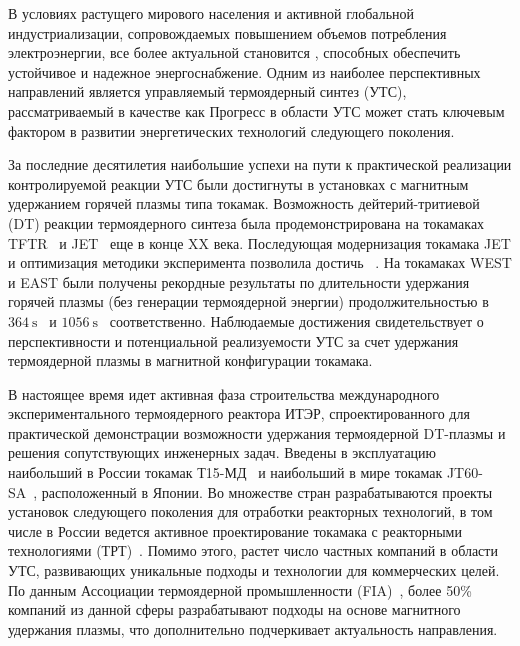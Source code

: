 
{\actuality} В условиях растущего мирового населения и активной глобальной индустриализации, сопровождаемых повышением объемов потребления электроэнергии,
все более актуальной становится , способных обеспечить устойчивое и надежное энергоснабжение.  Одним из наиболее перспективных направлений является управляемый термоядерный синтез (УТС), рассматриваемый в качестве как  Прогресс в области УТС может стать ключевым фактором в развитии энергетических технологий следующего поколения.

За последние десятилетия наибольшие успехи на пути к практической реализации контролируемой реакции УТС были достигнуты в установках с магнитным удержанием горячей плазмы типа токамак. Возможность  дейтерий-тритиевой (DT) реакции термоядерного синтеза была продемонстрирована на токамаках TFTR~\cite{Skinner1997} и JET~\cite{Keilhacker1999} еще в конце XX века. Последующая модернизация токамака JET и оптимизация методики эксперимента позволила достичь ~\cite{Maggi2024,Kappatou2025}. На токамаках WEST и EAST были получены рекордные результаты по длительности удержания горячей плазмы (без генерации термоядерной энергии) продолжительностью в \(\SI{364}{\second}\)~\cite{Shi2025} и \(\SI{1056}{\second}\)~\cite{Gong2024} соответственно. Наблюдаемые достижения свидетельствует о перспективности и потенциальной реализуемости УТС за счет удержания термоядерной плазмы в магнитной конфигурации токамака.

В настоящее время идет активная фаза строительства международного экспериментального термоядерного реактора ИТЭР, спроектированного для практической демонстрации возможности  удержания термоядерной DT-плазмы и решения сопутствующих инженерных задач. Введены в эксплуатацию наибольший в России токамак Т15-МД~\cite{Velikhov2024} и наибольший в мире токамак JT60-SA~\cite{Shirai2024}, расположенный в Японии. Во множестве стран разрабатываются проекты установок следующего поколения для отработки реакторных технологий, в том числе в России ведется активное проектирование токамака с реакторными технологиями (ТРТ)~\cite{Krasilnikov2021}. Помимо этого, растет число частных компаний в области УТС, развивающих уникальные подходы и технологии для коммерческих целей. По данным Ассоциации термоядерной промышленности (FIA)~\cite{FIA}, более 50\% компаний из данной сферы разрабатывают подходы на основе магнитного удержания плазмы, что дополнительно подчеркивает актуальность направления.

